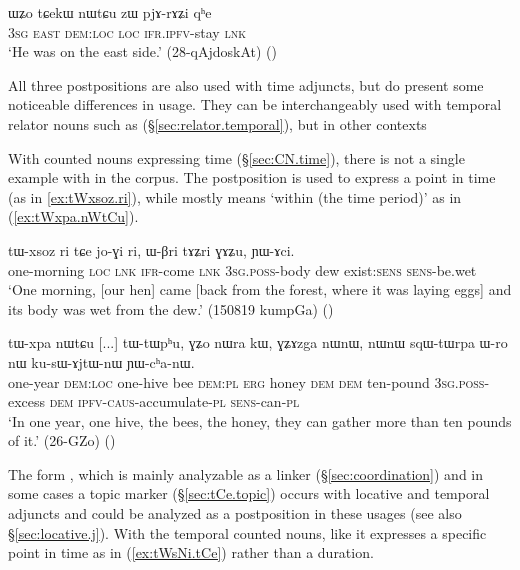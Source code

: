  \begin{exe}
\ex \label{ex:tCAkW.nWtCu.zW}
\gll   ɯʑo tɕekɯ nɯtɕu zɯ pjɤ-rɤʑi qʰe \\
\textsc{3sg} \textsc{east} \textsc{dem}:\textsc{loc} \textsc{loc} \textsc{ifr}.\textsc{ipfv}-stay \textsc{lnk}  \\
\glt `He was on the east side.' (28-qAjdoskAt) ()
  \end{exe}
   
All three postpositions are also used with time adjuncts, but do present some noticeable differences in usage. They can be interchangeably used with temporal relator nouns such as  (§\ref{sec:relator.temporal}), but in other contexts 

With counted nouns expressing time (§\ref{sec:CN.time}), there is not a single example with  in the corpus. The postposition  is used to express a point in time  (as in \ref{ex:tWxsoz.ri}), while  mostly means `within (the time period)' as in (\ref{ex:tWxpa.nWtCu}).  

\begin{exe}
\ex \label{ex:tWxsoz.ri}
\gll tɯ-xsoz ri tɕe jo-ɣi ri, ɯ-βri tɤʑri ɣɤʑu, ɲɯ-ɤci. \\
one-morning \textsc{loc} \textsc{lnk} \textsc{ifr}-come \textsc{lnk} \textsc{3sg}.\textsc{poss}-body dew exist:\textsc{sens} \textsc{sens}-be.wet \\
\glt `One morning, [our hen] came [back from the forest, where it was laying eggs] and its body was wet from the dew.' (150819 kumpGa) ()
\end{exe}

\begin{exe}
\ex \label{ex:tWxpa.nWtCu}
\gll  tɯ-xpa nɯtɕu [...] tɯ-tɯpʰu, ɣʑo nɯra kɯ, ɣʑɤzga nɯnɯ, nɯnɯ sqɯ-tɯrpa ɯ-ro nɯ ku-sɯ-ɤjtɯ-nɯ ɲɯ-cʰa-nɯ. \\
one-year \textsc{dem}:\textsc{loc} { } one-hive bee \textsc{dem}:\textsc{pl} \textsc{erg} honey \textsc{dem} \textsc{dem} ten-pound \textsc{3sg}.\textsc{poss}-excess \textsc{dem} \textsc{ipfv}-\textsc{caus}-accumulate-\textsc{pl} \textsc{sens}-can-\textsc{pl} \\
\glt  `In one year, one hive, the bees, the honey, they can gather more than ten pounds of it.' (26-GZo) 	()
\end{exe}

The form , which  is mainly analyzable as a linker (§\ref{sec:coordination}) and in some cases a topic marker (§\ref{sec:tCe.topic}) occurs with locative and temporal adjuncts and could be analyzed as a postposition in these usages (see also §\ref{sec:locative.j}). With the temporal counted nouns, like  it expresses a specific point in time as in (\ref{ex:tWsNi.tCe}) rather than a duration.

